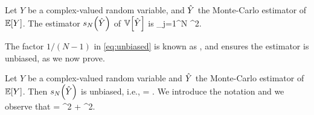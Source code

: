 Let $Y$ be a complex-valued random variable, and $\hat{Y}$ the Monte-Carlo estimator of $\EXP{Y}$. The estimator $\unbiased{\Yhat}{N}$ of $\VAR{\Yhat}$ is
\beq\label{eq:unbiased}
 \de {} \sum_{j=1}^N \abs{\Yj - \Yhat}^2.
\eeq
\ede

The factor $1/(N-1)$ in \cref{eq:unbiased} is known as , and ensures the estimator is unbiased, as we now prove.

\label{lem:unbiased}
Let $Y$ be a complex-valued random variable and  $\hat{Y}$ the Monte-Carlo estimator of $\EXP{Y}$. Then $\unbiased{\Yhat}{N}$ is unbiased, i.e.,
\beqs
{} = \VAR{\Yhat}.
\eeqs
\ele
{}
We introduce the notation
\beqs
\mu \de {}\quad\tand\quad\sigma \de {}
\eeqs
and we observe that
\beq\label{eq:varrelation}
 = \sigma^2 + \mu^2.
\eeq

